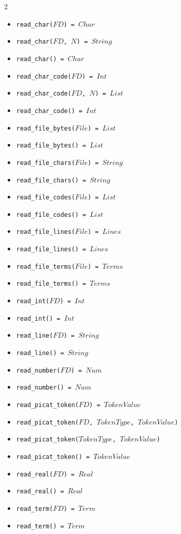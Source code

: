 \documentclass[10pt]{article}
\begin{document}
\begin{multicols}{2}
\begin{scriptsize}
\begin{itemize}
   \item \texttt{read\_char($FD$) = $Char$}
   \item \texttt{read\_char($FD$, $N$) = $String$}
   \item \texttt{read\_char() = $Char$}
   \item \texttt{read\_char\_code($FD$) = $Int$}
   \item \texttt{read\_char\_code($FD$, $N$) = $List$}
   \item \texttt{read\_char\_code() = $Int$}
   \item \texttt{read\_file\_bytes($File$) = $List$}
   \item \texttt{read\_file\_bytes() = $List$}
   \item \texttt{read\_file\_chars($File$) = $String$}
   \item \texttt{read\_file\_chars() = $String$}
   \item \texttt{read\_file\_codes($File$) = $List$}
   \item \texttt{read\_file\_codes() = $List$}
   \item \texttt{read\_file\_lines($File$) = $Lines$}
   \item \texttt{read\_file\_lines() = $Lines$}
   \item \texttt{read\_file\_terms($File$) = $Terms$}
   \item \texttt{read\_file\_terms() = $Terms$}
   \item \texttt{read\_int($FD$) = $Int$}
   \item \texttt{read\_int() = $Int$}
   \item \texttt{read\_line($FD$) = $String$}
   \item \texttt{read\_line() = $String$}
   \item \texttt{read\_number($FD$) = $Num$}
   \item \texttt{read\_number() = $Num$}
   \item \texttt{read\_picat\_token($FD$) = $TokenValue$}
   \item \texttt{read\_picat\_token($FD$, $TokenType$, $TokenValue$)}
   \item \texttt{read\_picat\_token($TokenType$, $TokenValue$)}
   \item \texttt{read\_picat\_token() = $TokenValue$}
   \item \texttt{read\_real($FD$) = $Real$}
   \item \texttt{read\_real() = $Real$}
   \item \texttt{read\_term($FD$) = $Term$}
   \item \texttt{read\_term() = $Term$}

\end{itemize}
\end{scriptsize}
\end{multicols}
\end{document}
